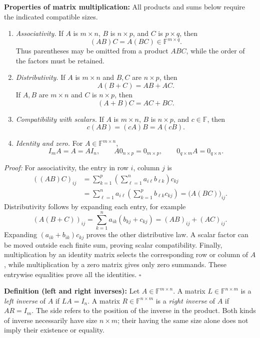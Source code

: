 \documentclass[a4paper,11pt,abstract=true]{scrartcl}
\theoremstyle{dotlessP}
\theoremstyle{dotlessS}
\theoremstyle{remark}
\theoremstyle{definition}
\begin{document}
\begin{claim_box}
\textbf{Properties of matrix multiplication:} All products and
sums below require the indicated compatible sizes.
\begin{enumerate}
    \item \emph{Associativity.} If $A$ is $m\times n$, $B$ is
    $n\times p$, and $C$ is $p\times q$, then
    \[
    (AB)C=A(BC)\in\mathbb{F}^{m\times q}.
    \]
    Thus parentheses may be omitted from a product $ABC$, while
    the order of the factors must be retained.
    \item \emph{Distributivity.} If $A$ is $m\times n$ and $B,C$
    are $n\times p$, then
    \[
    A(B+C)=AB+AC.
    \]
    If $A,B$ are $m\times n$ and $C$ is $n\times p$, then
    \[
    (A+B)C=AC+BC.
    \]
    \item \emph{Compatibility with scalars.} If $A$ is $m\times n$,
    $B$ is $n\times p$, and $c\in\mathbb{F}$, then
    \[
    c(AB)=(cA)B=A(cB).
    \]
    \item \emph{Identity and zero.} For $A\in\mathbb{F}^{m\times n}$,
    \[
    I_m A=A=A I_n,\qquad
    A0_{n\times p}=0_{m\times p},\qquad
    0_{q\times m}A=0_{q\times n}.
    \]
\end{enumerate}

\textit{Proof:} For associativity, the entry in row $i$, column $j$ is
\[
\begin{aligned}
{((AB)C)}_{ij}
&=\sum_{k=1}^p\left(\sum_{\ell=1}^n a_{i\ell}b_{\ell k}\right)c_{kj}\\
&=\sum_{\ell=1}^n a_{i\ell}
  \left(\sum_{k=1}^p b_{\ell k}c_{kj}\right)
={\bigl(A(BC)\bigr)}_{ij}.
\end{aligned}
\]
Distributivity follows by expanding each entry, for example
\[
{(A(B+C))}_{ij}
=\sum_{k=1}^n a_{ik}(b_{kj}+c_{kj})
={(AB)}_{ij}+{(AC)}_{ij}.
\]
Expanding $(a_{ik}+b_{ik})c_{kj}$ proves the other distributive law.
A scalar factor can be moved outside each finite sum, proving scalar
compatibility. Finally, multiplication by an identity matrix selects
the corresponding row or column of $A$, while multiplication by a zero
matrix gives only zero summands. These entrywise equalities prove all
the identities. \hfill$\square$
\end{claim_box}

\begin{claim_box}
\textbf{Definition (left and right inverses):} Let
$A\in\mathbb{F}^{m\times n}$. A matrix $L\in\mathbb{F}^{n\times m}$
is a \emph{left inverse} of $A$ if $LA=I_n$. A matrix
$R\in\mathbb{F}^{n\times m}$ is a \emph{right inverse} of $A$ if
$AR=I_m$. The side refers to the position of the inverse in the product.
Both kinds of inverse necessarily have size $n\times m$; their having
the same size alone does not imply their existence or equality.
\end{claim_box}
\end{document}
